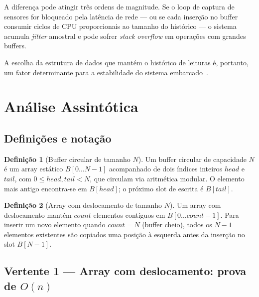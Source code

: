 \documentclass[12pt, a4paper]{article}
\theoremstyle{definition}
\newtheorem{definicao}{Definição}
\theoremstyle{remark}
\begin{document}
\medskip
A diferença pode atingir três ordens de magnitude. Se o loop de captura de
sensores for bloqueado pela latência de rede — ou se cada inserção no buffer
consumir ciclos de CPU proporcionais ao tamanho do histórico — o sistema
acumula \emph{jitter} amostral e pode sofrer \emph{stack overflow} em
operações com grandes buffers.

A escolha da estrutura de dados que mantém o histórico de leituras é, portanto,
um fator determinante para a estabilidade do sistema embarcado~\cite{esp32trm}.

\section{Análise Assintótica}

\subsection{Definições e notação}

\begin{definicao}[Buffer circular de tamanho $N$]
  Um buffer circular de capacidade $N$ é um array estático
  $B[0\ldots N-1]$ acompanhado de dois índices inteiros $\mathit{head}$ e
  $\mathit{tail}$, com $0 \leq \mathit{head}, \mathit{tail} < N$, que circulam
  via aritmética modular. O elemento mais antigo encontra-se em
  $B[\mathit{head}]$; o próximo slot de escrita é $B[\mathit{tail}]$.
\end{definicao}

\begin{definicao}[Array com deslocamento de tamanho $N$]
  Um array com deslocamento mantém $\mathit{count}$ elementos
  contíguos em $B[0\ldots \mathit{count}-1]$. Para inserir um novo elemento
  quando $\mathit{count} = N$ (buffer cheio), todos os $N-1$ elementos
  existentes são copiados uma posição à esquerda antes da inserção no slot
  $B[N-1]$.
\end{definicao}

\subsection{Vertente 1 — Array com deslocamento: prova de \texorpdfstring{$O(n)$}{O(n)}}
\end{document}

